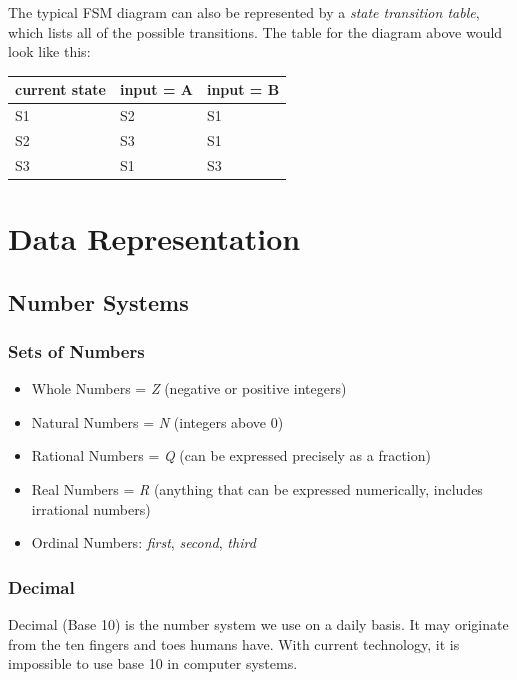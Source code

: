 \documentclass[9pt]{article}
\let\oldsection\section
\renewcommand\section{\clearpage\oldsection}
\begin{document}
The typical FSM diagram can also be represented by a \emph{state transition table}, which lists all of the possible transitions. The table for the diagram above would look like this:

\begin{center}
\begin{tabular}{lll}
\hline
current state & input = A & input = B\\
\hline
S1 & S2 & S1\\
S2 & S3 & S1\\
S3 & S1 & S3\\
\hline
\end{tabular}
\end{center}

\section{Data Representation}
\label{sec:orgd21cd64}
\subsection{Number Systems}
\label{sec:orgdc10ed6}
\subsubsection{Sets of Numbers}
\label{sec:org44a809d}

\begin{itemize}
\item Whole Numbers = \emph{Z} (negative or positive integers)
\item Natural Numbers = \emph{N} (integers above 0)
\item Rational Numbers = \emph{Q} (can be expressed precisely as a fraction)
\item Real Numbers = \emph{R} (anything that can be expressed numerically, includes irrational numbers)
\item Ordinal Numbers: \emph{first}, \emph{second}, \emph{third}
\end{itemize}

\subsubsection{Decimal}
\label{sec:org7a2c489}

Decimal (Base 10) is the number system we use on a daily basis. It may originate from the ten fingers and toes humans have. With current technology, it is impossible to use base 10 in computer systems.
\end{document}
